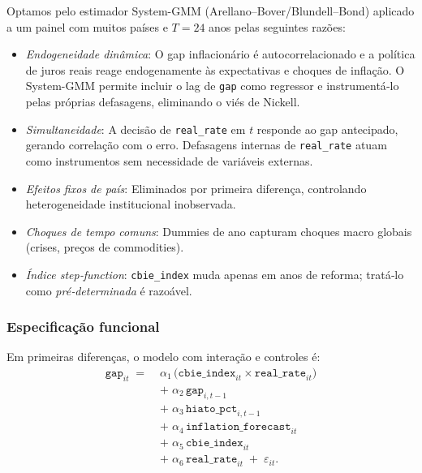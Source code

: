 \documentclass[a4paper,12pt]{article}[abnt2]
\begin{document}
Optamos pelo estimador System-GMM (Arellano–Bover/Blundell–Bond) aplicado a um painel com muitos países e $T=24$ anos pelas seguintes razões:
\begin{itemize}
  \item \emph{Endogeneidade dinâmica}: O gap inflacionário é autocorrelacionado e a política de juros reais reage endogenamente às expectativas e choques de inflação. O System-GMM permite incluir o lag de \texttt{gap} como regressor e instrumentá‐lo pelas próprias defasagens, eliminando o viés de Nickell.
  \item \emph{Simultaneidade}: A decisão de \texttt{real\_rate} em $t$ responde ao gap antecipado, gerando correlação com o erro. Defasagens internas de \texttt{real\_rate} atuam como instrumentos sem necessidade de variáveis externas.
  \item \emph{Efeitos fixos de país}: Eliminados por primeira diferença, controlando heterogeneidade institucional inobservada.
  \item \emph{Choques de tempo comuns}: Dummies de ano capturam choques macro globais (crises, preços de commodities).
  \item \emph{Índice step‐function}: \texttt{cbie\_index} muda apenas em anos de reforma; tratá‐lo como \emph{pré‐determinada} é razoável.
\end{itemize}

\subsubsection{\textbf{Especificação funcional}}

Em primeiras diferenças, o modelo com interação e controles é:
\begin{equation}\label{eq:gmm_gap_order}
\begin{aligned}
\texttt{gap}_{it} \;=\;&
  \alpha_{1}\,\bigl(\texttt{cbie\_index}_{it}\times\texttt{real\_rate}_{it}\bigr)\\
&+\;\alpha_{2}\,\texttt{gap}_{i,t-1}\\
&+\;\alpha_{3}\,\texttt{hiato\_pct}_{i,t-1}\\
&+\;\alpha_{4}\,\texttt{inflation\_forecast}_{it}\\
&+\;\alpha_{5}\,\texttt{cbie\_index}_{it}\\
&+\;\alpha_{6}\,\texttt{real\_rate}_{it}
\;+\;\varepsilon_{it}.
\end{aligned}
\end{equation}
\end{document}
